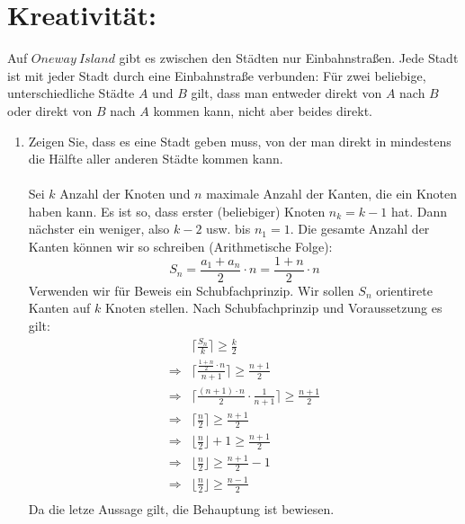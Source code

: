     \section*{Kreativit\"at:}
    Auf $Oneway \> Island$ gibt es zwischen den Städten nur Einbahnstraßen. Jede Stadt ist mit jeder
	Stadt durch eine Einbahnstraße verbunden: Für zwei beliebige, unterschiedliche Städte $A$ und
	$B$ gilt, dass man entweder direkt von $A$ nach $B$ oder direkt von $B$ nach $A$ kommen kann,
	nicht aber beides direkt.
    \begin{enumerate}[label=(\alph*)]
    	\item Zeigen Sie, dass es eine Stadt geben muss, von der man direkt in mindestens die Hälfte
		aller anderen Städte kommen kann.\\\\
		Sei $k$ Anzahl der Knoten und $n$ maximale Anzahl der Kanten, die ein Knoten haben kann. 
		Es ist so, dass erster (beliebiger) Knoten $n_k = k-1$ hat. Dann n\"achster ein weniger, 
		also $k-2$ usw. bis $n_1 = 1$. 
		Die gesamte Anzahl der Kanten k\"onnen wir so schreiben (Arithmetische Folge): 
		\[S_n = \frac{a_1+a_n}{2}\cdot n = \frac{1+n}{2}\cdot n\]
		Verwenden wir f\"ur Beweis ein Schubfachprinzip. Wir sollen $S_n$ orientirete Kanten auf $k$ 
		Knoten stellen. Nach Schubfachprinzip und Voraussetzung es gilt: 
		\begin{align*}
			&\bigg\lceil\frac{S_n}{k}\bigg\rceil \geq \frac{k}{2} \\
			\Rightarrow &\bigg\lceil\frac{\frac{1+n}{2}\cdot n}{n+1}\bigg\rceil \geq \frac{n+1}{2}\\
			\Rightarrow &\bigg\lceil\frac{(n+1)\cdot n}{2} \cdot \frac{1}{n+1}\bigg\rceil \geq \frac{n+1}{2}\\
			\Rightarrow &\bigg\lceil\frac{n}{2}\bigg\rceil \geq \frac{n+1}{2}\\
			\Rightarrow &\bigg\lfloor\frac{n}{2}\bigg\rfloor + 1 \geq \frac{n+1}{2}\\
			\Rightarrow &\bigg\lfloor\frac{n}{2}\bigg\rfloor \geq \frac{n+1}{2} - 1\\
			\Rightarrow &\bigg\lfloor\frac{n}{2}\bigg\rfloor \geq \frac{n-1}{2}\\
		\end{align*}
		Da die letze Aussage gilt, die Behauptung ist bewiesen.	


\end{enumerate}
